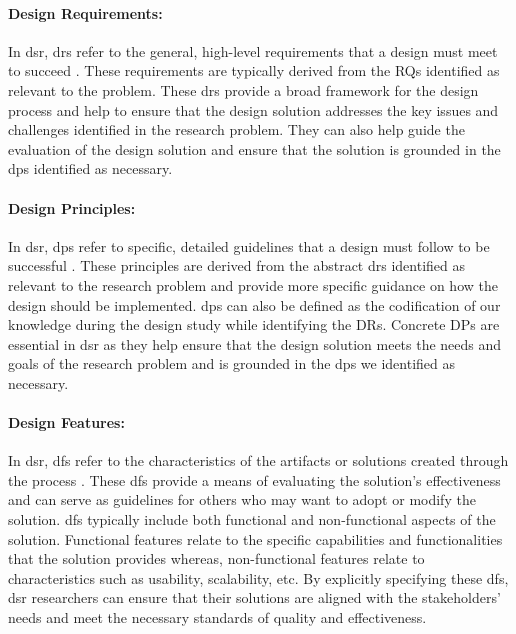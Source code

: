 \paragraph{Design Requirements:}
In \ac{dsr}, \ac{dr}s refer to the general, high-level requirements that a design must meet to succeed \cite{misc:dsr:webster}. 
These requirements are typically derived from the RQs identified as relevant to the problem.
These \ac{dr}s provide a broad framework for the design process and help to ensure that the design solution addresses the key issues and challenges identified in the research problem. 
They can also help guide the evaluation of the design solution and ensure that the solution is grounded in the \ac{dp}s identified as necessary.

\paragraph{Design Principles:}
In \ac{dsr}, \ac{dp}s refer to specific, detailed guidelines that a design must follow to be successful \cite{misc:dsr:webster}. 
These principles are derived from the abstract \ac{dr}s identified as relevant to the research problem and provide more specific guidance on how the design should be implemented.
\ac{dp}s can also be defined as the codification of our knowledge during the design study while identifying the DRs. 
Concrete DPs are essential in \ac{dsr} as they help ensure that the design solution meets the needs and goals of the research problem and is grounded in the \ac{dp}s we identified as necessary.

\paragraph{Design Features:}
In \ac{dsr}, \ac{df}s refer to the characteristics of the artifacts or solutions created through the process \cite{misc:dsr:webster}. 
These \ac{df}s provide a means of evaluating the solution's effectiveness and can serve as guidelines for others who may want to adopt or modify the solution.
\ac{df}s typically include both functional and non-functional aspects of the solution. 
Functional features relate to the specific capabilities and functionalities that the solution provides whereas, non-functional features relate to characteristics such as usability, scalability, etc. 
By explicitly specifying these \ac{df}s, \ac{dsr} researchers can ensure that their solutions are aligned with the stakeholders' needs and meet the necessary standards of quality and effectiveness.

